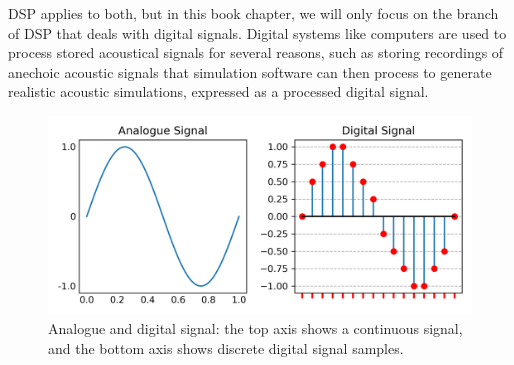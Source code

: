 DSP applies to both, but in this book chapter, we will only focus on the branch of DSP that deals with digital signals. Digital systems like computers are used to process stored acoustical signals for several reasons, such as storing recordings of anechoic acoustic signals that simulation software can then process to generate realistic acoustic simulations, expressed as a processed digital signal. \par
\begin{figure}
    \centering
    \includegraphics[width=1\linewidth]{analogue_digital}
    \caption{Analogue and digital signal: the top axis shows a continuous signal, and the bottom axis shows discrete digital signal samples.}
    \label{fig:analogue-digital-signal}
\end{figure}

